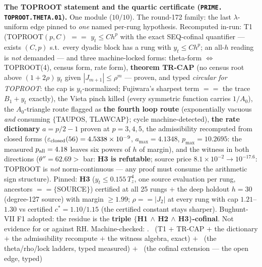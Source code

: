\documentclass[11pt,a4paper]{article}
\theoremstyle{definition}
\begin{document}
\par\smallskip\noindent\textbf{The TOPROOT statement and the
quartic certificate (\texttt{PRIME.\allowbreak
TOPROOT.\allowbreak THETA.01}).}
One module ($10/10$).  The round-172 family: the last
$\lambda$-uniform edge pinned to \emph{one} named per-rung
hypothesis.  Recomputed in-run: T1 (TOPROOT$(p, C)$ $==$ $y_t
\le C h^p$ with the exact SEQ-cofinal quantifier --- exists
$(C, p)$ s.t.\ every dyadic block has a rung with $y_t \le
C h^p$; an all-$h$ reading is \emph{not} demanded --- and three
machine-locked forms: theta-form $\iff$ TOPROOT(4), census form,
rate form), \textbf{theorem TR-CAP} (no census root above
$(1 + 2\rho)\,y_t$ given $|J_{m+1}| \le \rho^m$ --- proven, and
typed \emph{circular for TOPROOT}: the cap is $y_t$-normalized;
Fujiwara's sharpest term $==$ the trace $B_1 + y_t$ exactly),
the Vieta pinch killed (every symmetric function carries
$1/A_0$), the $A_0$-triangle route flagged as \textbf{the fourth
loop route} (exponentially vacuous \emph{and} consuming
$\{$TAUPOS, TLAWCAP$\}$; cycle machine-detected), \textbf{the
rate dictionary} $a = p/2 - 1$ proven at $p = 3, 4, 5$, the
admissibility recomputed from closed forms
($\varepsilon_{\rm closed}(56) = 4.5338\times10^{-9}$, $a_{\max}
= 4.1348$, $p_{\max} = 10.2695$: the measured $p_{\rm all} =
4.18$ leaves six powers of $h$ of margin), and the witness in
both directions ($\theta'' = 62.69 >$ bar: \textbf{H3 is
refutable}; source price $8.1\times10^{-2} \to 10^{-17.6}$:
TOPROOT is \emph{not} norm-continuous --- any proof must consume
the arithmetic sign structure).  Pinned: \textbf{H3} ($y_t \le
0.155\,T_z^4$, one source evaluation per rung, ancestors $==
\{$SOURCE$\}$) certified at all 25 rungs $+$ the deep holdout
$h = 30$ (degree-127 source) with margin $\ge 1.99$; $\rho ==
|J_2|$ at every rung with cap $1.21$--$1.30$ vs certified $c^* =
1.10/1.15$ (the certified constant stays sharper).  Bughunt-VII
F1 adopted: the residue is the \textbf{triple $\{$H1 $\wedge$ H2
$\wedge$ H3$\}$-cofinal}.  Not evidence for or against RH.
Machine-checked: .
\mE\ (T1 $+$ TR-CAP $+$ the dictionary $+$ the admissibility
recompute $+$ the witness algebra, exact) $+$ \mC\ (the
theta/rho/lock ladders, typed measured) $+$ \mO\ (the cofinal
extension --- the open edge, typed)
\par\smallskip
\end{document}
